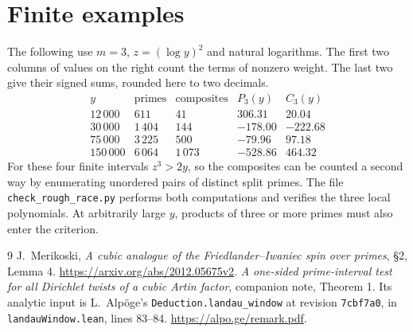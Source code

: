 \documentclass[11pt]{article}
\begin{document}
\section*{Finite examples}
The following use $m=3$, $z=(\log y)^2$ and natural logarithms. The first two columns of values on the right count the terms of nonzero weight. The last two give their signed sums, rounded here to two decimals.
\[
\begin{array}{r|rr|rr}
 y&\text{primes}&\text{composites}&P_3(y)&C_3(y)\\ \hline
 12\,000&611&41&306.31&20.04\\
 30\,000&1\,404&144&-178.00&-222.68\\
 75\,000&3\,225&500&-79.96&97.18\\
 150\,000&6\,064&1\,073&-528.86&464.32
\end{array}
\]
For these four finite intervals $z^3>2y$, so the composites can be counted a second way by enumerating unordered pairs of distinct split primes. The file \texttt{check\_rough\_race.py} performs both computations and verifies the three local polynomials. At arbitrarily large $y$, products of three or more primes must also enter the criterion.

\begin{thebibliography}{9}
 J.~Merikoski, \emph{A cubic analogue of the Friedlander--Iwaniec spin over primes}, \S2, Lemma 4. \url{https://arxiv.org/abs/2012.05675v2}.
 \emph{A one-sided prime-interval test for all Dirichlet twists of a cubic Artin factor}, companion note, Theorem 1. Its analytic input is L.~Alp\"oge's \texttt{Deduction.landau\_window} at revision \texttt{7cbf7a0}, in \texttt{landauWindow.lean}, lines 83--84. \url{https://alpo.ge/remark.pdf}.
\end{thebibliography}
\end{document}
